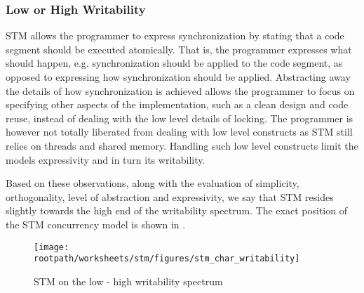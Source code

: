 \subsubsection{Low or High Writability}
\ac{STM} allows the programmer to express synchronization by stating that a code segment should be executed atomically. That is, the programmer expresses what should happen, e.g. synchronization should be applied to the code segment, as opposed to expressing how synchronization should be applied. Abstracting away the details of how synchronization is achieved allows the programmer to focus on specifying other aspects of the implementation, such as a clean design and code reuse, instead of dealing with the low level details of locking. The programmer is however not totally liberated from dealing with low level constructs as \ac{STM} still relies on threads and shared memory. Handling such low level constructs limit the models expressivity and in turn its writability.

Based on these observations, along with the evaluation of simplicity, orthogonality, level of abstraction and expressivity, we say that \ac{STM} resides slightly towards the high end of the writability spectrum. The exact position of the \ac{STM} concurrency model is shown in .

\begin{figure}[htbp]
\centering
 \texttt{[image: \\rootpath/worksheets/stm/figures/stm\_char\_writability]} 
 \caption{\ac{STM} on the low - high writability spectrum}
\label{fig:char_stm_writability}
\end{figure}

\worksheetend
